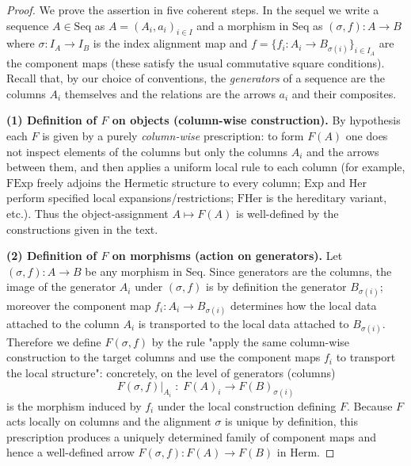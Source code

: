 \documentclass[11pt]{book}
\theoremstyle{definition}
\theoremstyle{plain}
\theoremstyle{remark}
\begin{document}
\begin{proof}
We prove the assertion in five coherent steps.  In the sequel we write a sequence
\(A\in\mathrm{Seq}\) as \(A=(A_i,a_i)_{i\in I}\) and a morphism in \(\mathrm{Seq}\) as
\((\sigma,f)\colon A\to B\) where \(\sigma\colon I_A\to I_B\) is the index
alignment map and \(f=\{f_i:A_i\to B_{\sigma(i)}\}_{i\in I_A}\) are the
component maps (these satisfy the usual commutative square conditions).
Recall that, by our choice of conventions, the \emph{generators} of a sequence
are the columns \(A_i\) themselves and the relations are the arrows \(a_i\)
and their composites.

\vspace{6pt}\noindent\textbf{(1) Definition of \(F\) on objects (column-wise construction).}
By hypothesis each \(F\) is given by a purely \emph{column-wise} prescription:
to form \(F(A)\) one does not inspect elements of the columns but only the
columns \(A_i\) and the arrows between them, and then applies a uniform local
rule to each column (for example, \(\mathrm{FExp}\) freely adjoins the Hermetic
structure to every column; \(\mathrm{Exp}\) and \(\mathrm{Her}\) perform
specified local expansions/restrictions; \(\mathrm{FHer}\) is the hereditary
variant, etc.).  Thus the object-assignment \(A\mapsto F(A)\) is well-defined
by the constructions given in the text.

\vspace{6pt}\noindent\textbf{(2) Definition of \(F\) on morphisms (action on generators).}
Let \((\sigma,f)\colon A\to B\) be any morphism in \(\mathrm{Seq}\).  Since generators
are the columns, the image of the generator \(A_i\) under \((\sigma,f)\) is by
definition the generator \(B_{\sigma(i)}\); moreover the component map
\(f_i\colon A_i\to B_{\sigma(i)}\) determines how the local data attached to
the column \(A_i\) is transported to the local data attached to \(B_{\sigma(i)}\).
Therefore we define \(F(\sigma,f)\) by the rule "apply the same column-wise
construction to the target columns and use the component maps \(f_i\) to
transport the local structure": concretely, on the level of generators (columns)
\[
    F(\sigma,f)\big|_{A_i}\;:\;F(A)_i\longrightarrow F(B)_{\sigma(i)}
\]
is the morphism induced by \(f_i\) under the local construction defining \(F\).
Because \(F\) acts locally on columns and the alignment \(\sigma\) is unique
by definition, this prescription produces a uniquely determined family of
component maps and hence a well-defined arrow \(F(\sigma,f)\colon F(A)\to F(B)\)
in \(\mathrm{Herm}\).


\end{proof}
\end{document}
